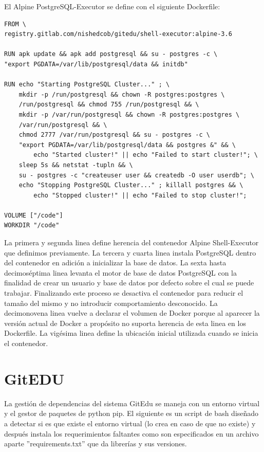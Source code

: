 El Alpine PostgreSQL-Executor se define con el siguiente Dockerfile:
\begin{lstlisting}
FROM \
registry.gitlab.com/nishedcob/gitedu/shell-executor:alpine-3.6

RUN apk update && apk add postgresql && su - postgres -c \
"export PGDATA=/var/lib/postgresql/data && initdb"

RUN echo "Starting PostgreSQL Cluster..." ; \
    mkdir -p /run/postgresql && chown -R postgres:postgres \
    /run/postgresql && chmod 755 /run/postgresql && \
    mkdir -p /var/run/postgresql && chown -R postgres:postgres \
    /var/run/postgresql && \
    chmod 2777 /var/run/postgresql && su - postgres -c \
    "export PGDATA=/var/lib/postgresql/data && postgres &" && \
        echo "Started cluster!" || echo "Failed to start cluster!"; \
    sleep 5s && netstat -tupln && \
    su - postgres -c "createuser user && createdb -O user userdb"; \
    echo "Stopping PostgreSQL Cluster..." ; killall postgres && \
        echo "Stopped cluster!" || echo "Failed to stop cluster!";

VOLUME ["/code"]
WORKDIR "/code"
\end{lstlisting}
La primera y segunda linea define herencia del contenedor Alpine Shell-Executor que definimos previamente. La tercera y cuarta linea instala PostgreSQL dentro del contenedor en adición a inicializar la base de datos. La sexta hasta decimoséptima linea levanta el motor de base de datos PostgreSQL con la finalidad de crear un usuario y base de datos por defecto sobre el cual se puede trabajar. Finalizando este proceso se desactiva el contenedor para reducir el tamaño del mismo y no introducir comportamiento desconocido. La decimonovena linea vuelve a declarar el volumen de Docker porque al aparecer la versión actual de Docker a propósito no suporta herencia de esta linea en los Dockerfile. La vigésima linea define la ubicación inicial utilizada cuando se inicia el contenedor.

\section{GitEDU}

La gestión de dependencias del sistema GitEdu se maneja con un entorno virtual y el gestor de paquetes de python pip. El siguiente es un script de bash diseñado a detectar si es que existe el entorno virtual (lo crea en caso de que no existe) y después instala los requerimientos faltantes como son especificados en un archivo aparte ''requirements.txt'' que da librerías y sus versiones.

